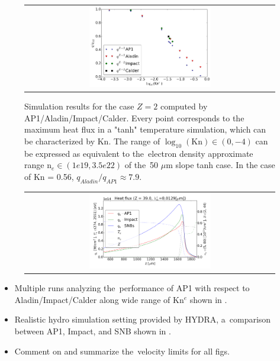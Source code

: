 \begin{figure}[tbh]
  \begin{center}
    \begin{tabular}{c}
      \includegraphics[width=0.5\textwidth]{Kn_results.png}
    \end{tabular}
  \caption{  
  Simulation results for the case $Z=2$ computed by AP1/Aladin/Impact/Calder.
  Every point corresponds to the maximum heat flux in a "tanh" temperature 
  simulation, which can be characterized by Kn. The range of 
  $\log_{10}(\text{Kn})\in (0, -4)$ can be expressed as equivalent 
  to the~electron density approximate range n$_e \in (1e19, 3.5e22)$ of 
  the~50 $\mu$m slope tanh case. In the case of Kn = 0.56, 
  $q_{Aladin} / q_{AP1}\approx 7.9$.}
  \label{fig:Kn_results}
  \end{center} 
\end{figure}

\begin{figure}[tbh]
  \begin{center}
    \begin{tabular}{c}
      \includegraphics[width=0.5\textwidth]{../VFPdata/GD_Hohlraum/fluxes_10ps.png} 
    \end{tabular}
  \caption{
  }
  \label{fig:Gd_VFP_10ps_heatflux}
  \end{center} 
\end{figure}

\begin{itemize}
  \item Multiple runs analyzing the~performance of AP1 with respect to 
    Aladin/Impact/Calder along wide range of Kn$^e$ shown in 
    .
  \item Realistic hydro simulation setting provided by HYDRA, a~comparison
    between AP1, Impact, and SNB shown in .
  \item Comment on and summarize the~velocity limits for all figs.
\end{itemize}

%
